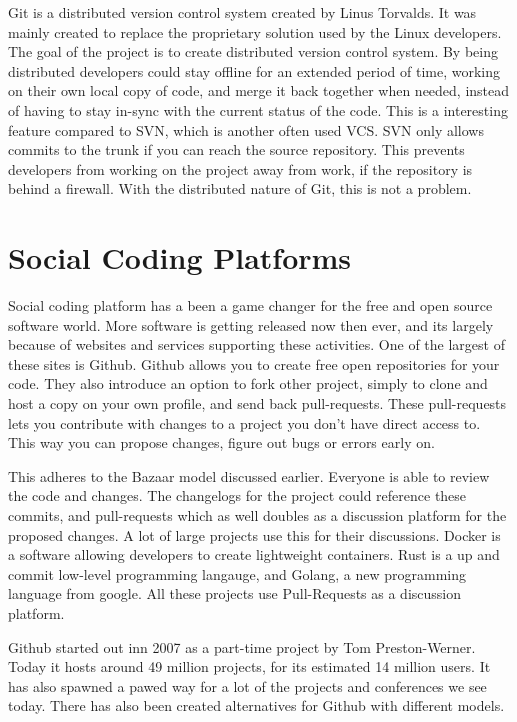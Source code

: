 \documentclass[12pt]{article}
\begin{document}
Git is a distributed version control system created by Linus Torvalds\cite{git}.
It was mainly created to replace the proprietary solution used by the Linux
developers.  The goal of the project is to create distributed version control
system. By being distributed developers could stay offline for an extended
period of time, working on their own local copy of code, and merge it back
together when needed, instead of having to stay in-sync with the current status
of the code. This is a interesting feature compared to SVN, which is another
often used VCS. SVN only allows commits to the trunk if you can reach the source
repository.  This prevents developers from working on the project away from
work, if the repository is behind a firewall. With the distributed nature of
Git, this is not a problem.


\section{Social Coding Platforms}
Social coding platform has a been a game changer for the free and open source
software world. More software is getting released now then ever, and its largely
because of websites and services supporting these activities. One of the largest
of these sites is Github. Github allows you to create free open repositories for
your code. They also introduce an option to fork other project, simply to clone
and host a copy on your own profile, and send back pull-requests. These
pull-requests lets you contribute with changes to a project you don't have
direct access to. This way you can propose changes, figure out bugs or errors
early on.

This adheres to the Bazaar model discussed earlier. Everyone is able to review
the code and changes. The changelogs for the project could reference these
commits, and pull-requests which as well doubles as a discussion platform for
the proposed changes. A lot of large projects use this for their discussions.
Docker is a software allowing developers to create lightweight containers. Rust
is a up and commit low-level programming langauge, and Golang, a new
programming language from google. All these projects use Pull-Requests as a
discussion platform.

Github started out inn 2007 as a part-time project by Tom Preston-Werner. Today
it hosts around 49 million projects, for its estimated 14 million
users\cite{github-about}. It has also spawned a pawed way for a lot of the
projects and conferences we see today.  There has also been created alternatives
for Github with different models.
\end{document}
